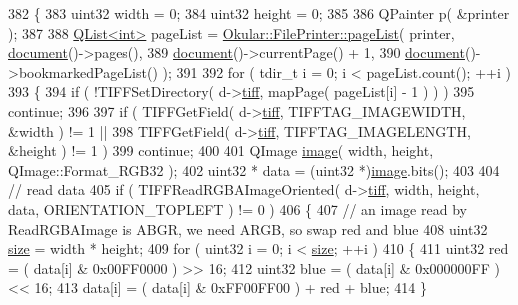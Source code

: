 \begin{DoxyCode}
382 \{
383     uint32 width = 0;
384     uint32 height = 0;
385 
386     QPainter p( &printer );
387 
388     \hyperlink{classQList}{QList<int>} pageList = \hyperlink{classOkular_1_1FilePrinter_aed485e5e3fbe591b16e15915e318a1b7}{Okular::FilePrinter::pageList}( printer, 
      \hyperlink{classOkular_1_1Generator_a4248672ef04e62660d51f16c0a862bbe}{document}()->pages(),
389                                                          \hyperlink{classOkular_1_1Generator_a4248672ef04e62660d51f16c0a862bbe}{document}()->currentPage() + 1,
390                                                          \hyperlink{classOkular_1_1Generator_a4248672ef04e62660d51f16c0a862bbe}{document}()->bookmarkedPageList() );
391 
392     \textcolor{keywordflow}{for} ( tdir\_t i = 0; i < pageList.count(); ++i )
393     \{
394         \textcolor{keywordflow}{if} ( !TIFFSetDirectory( d->\hyperlink{classTIFFGenerator_1_1Private_abe0f02dd2a2177e43a18938d465ef328}{tiff}, mapPage( pageList[i] - 1 ) ) )
395             \textcolor{keywordflow}{continue};
396 
397         \textcolor{keywordflow}{if} ( TIFFGetField( d->\hyperlink{classTIFFGenerator_1_1Private_abe0f02dd2a2177e43a18938d465ef328}{tiff}, TIFFTAG\_IMAGEWIDTH, &width ) != 1 ||
398              TIFFGetField( d->\hyperlink{classTIFFGenerator_1_1Private_abe0f02dd2a2177e43a18938d465ef328}{tiff}, TIFFTAG\_IMAGELENGTH, &height ) != 1 )
399             \textcolor{keywordflow}{continue};
400 
401         QImage \hyperlink{classTIFFGenerator_aba1b5aafb7e194b48f4b5a8a02e47ddb}{image}( width, height, QImage::Format\_RGB32 );
402         uint32 * data = (uint32 *)\hyperlink{classTIFFGenerator_aba1b5aafb7e194b48f4b5a8a02e47ddb}{image}.bits();
403 
404         \textcolor{comment}{// read data}
405         \textcolor{keywordflow}{if} ( TIFFReadRGBAImageOriented( d->\hyperlink{classTIFFGenerator_1_1Private_abe0f02dd2a2177e43a18938d465ef328}{tiff}, width, height, data, ORIENTATION\_TOPLEFT ) != 0 )
406         \{
407             \textcolor{comment}{// an image read by ReadRGBAImage is ABGR, we need ARGB, so swap red and blue}
408             uint32 \hyperlink{synctex__parser_8c_aa23c661441688350614bd6a350d2b6ff}{size} = width * height;
409             \textcolor{keywordflow}{for} ( uint32 i = 0; i < \hyperlink{synctex__parser_8c_aa23c661441688350614bd6a350d2b6ff}{size}; ++i )
410             \{
411                 uint32 red = ( data[i] & 0x00FF0000 ) >> 16;
412                 uint32 blue = ( data[i] & 0x000000FF ) << 16;
413                 data[i] = ( data[i] & 0xFF00FF00 ) + red + blue;
414             \}

\end{DoxyCode}
